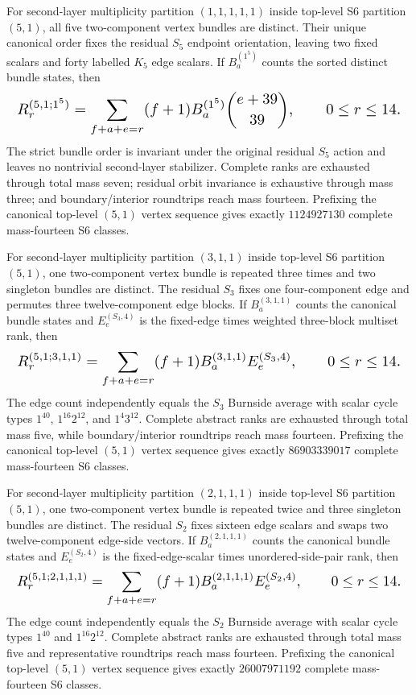 \documentclass{article}
\newcommand{\fitmath}[1]{\resizebox{0.99\linewidth}{!}{$\displaystyle #1$}}
\begin{document}
For second-layer multiplicity partition $(1,1,1,1,1)$ inside top-level S6
partition $(5,1)$, all five two-component vertex bundles are distinct. Their
unique canonical order fixes the residual $S_5$ endpoint orientation, leaving
two fixed scalars and forty labelled $K_5$ edge scalars. If
$B_a^{(1^5)}$ counts the sorted distinct bundle states, then
\begin{equation}
  \fitmath{%
    R_r^{(5,1;1^5)}=
      \sum_{f+a+e=r}(f+1)
      B_a^{(1^5)}{e+39\choose39},
    \qquad 0\leq r\leq14.
  }
  \label{eq:optimization-crazy-sextuple-s6-s5-distinct-bundle-ranking}
\end{equation}
The strict bundle order is invariant under the original residual $S_5$ action
and leaves no nontrivial second-layer stabilizer. Complete ranks are exhausted
through total mass seven; residual orbit invariance is exhaustive through mass
three; and boundary/interior roundtrips reach mass fourteen. Prefixing the
canonical top-level $(5,1)$ vertex sequence gives exactly $1124927130$ complete
mass-fourteen S6 classes.

For second-layer multiplicity partition $(3,1,1)$ inside top-level S6
partition $(5,1)$, one two-component vertex bundle is repeated three times and
two singleton bundles are distinct. The residual $S_3$ fixes one four-component
edge and permutes three twelve-component edge blocks. If
$B_a^{(3,1,1)}$ counts the canonical bundle states and $E_e^{(S_3,4)}$ is the
fixed-edge times weighted three-block multiset rank, then
\begin{equation}
  \fitmath{%
    R_r^{(5,1;3,1,1)}=
      \sum_{f+a+e=r}(f+1)
      B_a^{(3,1,1)}E_e^{(S_3,4)},
    \qquad 0\leq r\leq14.
  }
  \label{eq:optimization-crazy-sextuple-s6-s5-s3-bundle-ranking}
\end{equation}
The edge count independently equals the $S_3$ Burnside average with scalar
cycle types $1^{40}$, $1^{16}2^{12}$, and $1^4 3^{12}$. Complete abstract ranks
are exhausted through total mass five, while boundary/interior roundtrips reach
mass fourteen. Prefixing the canonical top-level $(5,1)$ vertex sequence gives
exactly $86903339017$ complete mass-fourteen S6 classes.

For second-layer multiplicity partition $(2,1,1,1)$ inside top-level S6
partition $(5,1)$, one two-component vertex bundle is repeated twice and three
singleton bundles are distinct. The residual $S_2$ fixes sixteen edge scalars
and swaps two twelve-component edge-side vectors. If $B_a^{(2,1,1,1)}$ counts
the canonical bundle states and $E_e^{(S_2,4)}$ is the fixed-edge-scalar times
unordered-side-pair rank, then
\begin{equation}
  \fitmath{%
    R_r^{(5,1;2,1,1,1)}=
      \sum_{f+a+e=r}(f+1)
      B_a^{(2,1,1,1)}E_e^{(S_2,4)},
    \qquad 0\leq r\leq14.
  }
  \label{eq:optimization-crazy-sextuple-s6-s5-s2-bundle-ranking}
\end{equation}
The edge count independently equals the $S_2$ Burnside average with scalar
cycle types $1^{40}$ and $1^{16}2^{12}$. Complete abstract ranks are exhausted
through total mass five and representative roundtrips reach mass fourteen.
Prefixing the canonical top-level $(5,1)$ vertex sequence gives exactly
$26007971192$ complete mass-fourteen S6 classes.
\end{document}
